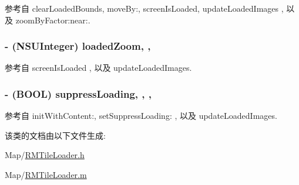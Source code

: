 参考自 clear\-Loaded\-Bounds, move\-By\-:, screen\-Is\-Loaded, update\-Loaded\-Images , 以及 zoom\-By\-Factor\-:near\-:.

\hypertarget{interface_r_m_tile_loader_a6544e37d349c348bbcb60af607880852}{
\subsubsection[{loaded\-Zoom}]{\setlength{\rightskip}{0pt plus 5cm}-\/ (N\-S\-U\-Integer) loaded\-Zoom\hspace{0.3cm}{\ttfamily [read]}, {\ttfamily [nonatomic]}, {\ttfamily [assign]}}}\label{interface_r_m_tile_loader_a6544e37d349c348bbcb60af607880852}


参考自 screen\-Is\-Loaded , 以及 update\-Loaded\-Images.

\hypertarget{interface_r_m_tile_loader_a91d1084745308ffb237b900c2a4aca77}{
\subsubsection[{suppress\-Loading}]{\setlength{\rightskip}{0pt plus 5cm}-\/ (B\-O\-O\-L) suppress\-Loading\hspace{0.3cm}{\ttfamily [read]}, {\ttfamily [write]}, {\ttfamily [atomic]}, {\ttfamily [assign]}}}\label{interface_r_m_tile_loader_a91d1084745308ffb237b900c2a4aca77}


参考自 init\-With\-Content\-:, set\-Suppress\-Loading\-: , 以及 update\-Loaded\-Images.



该类的文档由以下文件生成\-:\begin{DoxyCompactItemize}
\item 
Map/\hyperlink{_r_m_tile_loader_8h}{R\-M\-Tile\-Loader.\-h}\item 
Map/\hyperlink{_r_m_tile_loader_8m}{R\-M\-Tile\-Loader.\-m}\end{DoxyCompactItemize}
